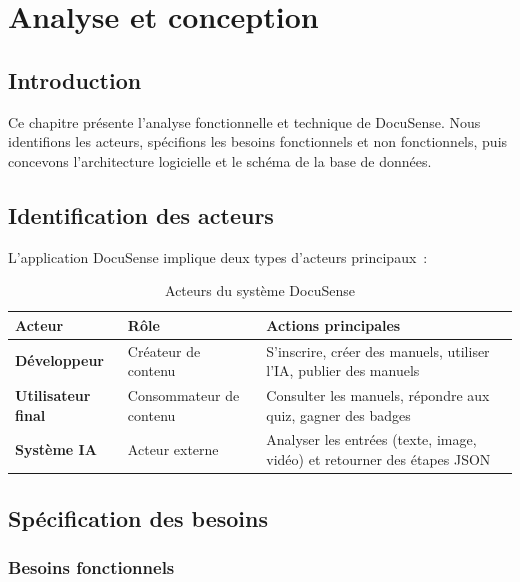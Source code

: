 \documentclass[12pt, a4paper, twoside, openany]{report}
\begin{document}
\chapter{Analyse et conception}

\section{Introduction}

Ce chapitre pr\'esente l'analyse fonctionnelle et technique de DocuSense. Nous
identifions les acteurs, sp\'ecifions les besoins fonctionnels et non fonctionnels,
puis concevons l'architecture logicielle et le sch\'ema de la base de donn\'ees.

\section{Identification des acteurs}

L'application DocuSense implique deux types d'acteurs principaux~:

\begin{table}[H]
  \centering
  \caption{Acteurs du syst\`eme DocuSense}
  \label{tab:acteurs}
  \begin{tabularx}{\textwidth}{l l X}
    \toprule
    \textbf{Acteur} & \textbf{R\^ole} & \textbf{Actions principales} \\
    \midrule
    \textbf{D\'eveloppeur} & Cr\'eateur de contenu
      & S'inscrire, cr\'eer des manuels, utiliser l'IA, publier des manuels \\
    \textbf{Utilisateur final} & Consommateur de contenu
      & Consulter les manuels, r\'epondre aux quiz, gagner des badges \\
    \textbf{Syst\`eme IA} & Acteur externe
      & Analyser les entr\'ees (texte, image, vid\'eo) et retourner des \'etapes JSON \\
    \bottomrule
  \end{tabularx}
\end{table}

\section{Sp\'ecification des besoins}

\subsection{Besoins fonctionnels}
\end{document}
